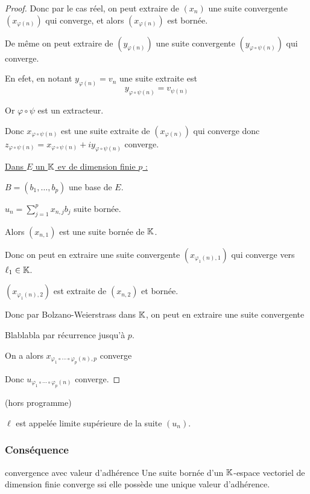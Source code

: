 \begin{proof}
    Donc par le cas réel, on peut extraire de $(x_n)$ une suite convergente $(x_{\varphi(n)})$
    qui converge, et alors $(x_{\varphi(n)})$ est bornée. 

    De même on peut extraire de $(y_{\varphi(n)})$ une suite convergente $(y_{\varphi \circ \psi(n)})$ 
    qui converge. 

    En efet, en notant $y_{\varphi(n)} = v_n$ une suite extraite est 
    $$y_{\varphi \circ \psi(n)} = v_{\psi(n)}$$

    Or $\varphi \circ \psi$ est un extracteur.

    Donc $x_{\varphi \circ \psi(n)}$ est une suite extraite de $(x_{\varphi(n)})$ qui converge
    donc $z_{\varphi \circ \psi(n)} = x_{\varphi \circ \psi(n)} + i y_{\varphi \circ \psi(n)}$ converge. 

    \avspace \qquad \uline{Dans $E$ un $\mathbb{K}$ ev de dimension finie $p$ :}

    \svspace $B = (b_1, \dots, b_p)$ une base de $E$.

    $u_n = \sum_{j = 1}^{p } x_{n, j} b_j$ suite bornée. 

    Alors $(x_{n, 1})$ est une suite bornée de $\mathbb{K}$.    

    Donc on peut en extraire une suite convergente $(x_{\varphi_1(n), 1})$ 
    qui converge vers $\ell_1 \in \mathbb{K}$.

    $(x_{\varphi_1(n), 2})$ est extraite de $(x_{n, 2})$ et bornée.

    Donc par Bolzano-Weierstrass dans $\mathbb{K}$, on peut en extraire une suite convergente

    Blablabla par récurrence jusqu'à $p$.

    On a alors $x_{\varphi_1 \circ \cdots \circ \varphi_p(n), p}$ converge 

    Donc $u_{\varphi_1 \circ \cdots \circ \varphi_p(n)}$ converge. 
\end{proof}


\begin{remarque} (hors programme)

    $\ell$ est appelée limite supérieure de la suite $(u_n)$.
\end{remarque}

\subsubsection{Conséquence }

\begin{theoreme}{convergence avec valeur d'adhérence}{}
    Une suite bornée d'un $\mathbb{K}$-espace vectoriel de dimension finie converge ssi elle possède
    une unique valeur d'adhérence.
\end{theoreme}

